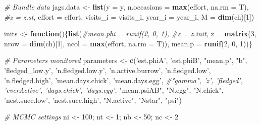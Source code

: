 \documentclass[]{article}
\newenvironment{Shaded}{\begin{snugshade}}{\end{snugshade}}
\newcommand{\KeywordTok}[1]{\textcolor[rgb]{0.13,0.29,0.53}{\textbf{#1}}}
\newcommand{\DataTypeTok}[1]{\textcolor[rgb]{0.13,0.29,0.53}{#1}}
\newcommand{\DecValTok}[1]{\textcolor[rgb]{0.00,0.00,0.81}{#1}}
\newcommand{\StringTok}[1]{\textcolor[rgb]{0.31,0.60,0.02}{#1}}
\newcommand{\CommentTok}[1]{\textcolor[rgb]{0.56,0.35,0.01}{\textit{#1}}}
\newcommand{\ControlFlowTok}[1]{\textcolor[rgb]{0.13,0.29,0.53}{\textbf{#1}}}
\newcommand{\NormalTok}[1]{#1}
\begin{document}
\begin{Shaded}
\begin{Highlighting}[]
\CommentTok{# Bundle data}
\NormalTok{jags.data <-}\StringTok{ }\KeywordTok{list}\NormalTok{(}\DataTypeTok{y =}\NormalTok{ y, }\DataTypeTok{n.occasions =} \KeywordTok{max}\NormalTok{(effort, }\DataTypeTok{na.rm =}\NormalTok{ T), }
                  \CommentTok{#z = z.st, }
                  \DataTypeTok{effort =}\NormalTok{ effort, }
                  \DataTypeTok{visits_i =}\NormalTok{ visits_i, }\DataTypeTok{year_i =}\NormalTok{ year_i,}
                  \DataTypeTok{M =} \KeywordTok{dim}\NormalTok{(ch)[}\DecValTok{1}\NormalTok{])}

\NormalTok{inits <-}\StringTok{ }\ControlFlowTok{function}\NormalTok{()\{}\KeywordTok{list}\NormalTok{(}\CommentTok{#mean.phi = runif(2, 0, 1), }
                         \CommentTok{#z = z.init,}
                         \DataTypeTok{z =} \KeywordTok{matrix}\NormalTok{(}\DecValTok{3}\NormalTok{, }\DataTypeTok{nrow =} \KeywordTok{dim}\NormalTok{(ch)[}\DecValTok{1}\NormalTok{], }\DataTypeTok{ncol =} \KeywordTok{max}\NormalTok{(effort, }\DataTypeTok{na.rm =}\NormalTok{ T)),}
                         \DataTypeTok{mean.p =} \KeywordTok{runif}\NormalTok{(}\DecValTok{2}\NormalTok{, }\DecValTok{0}\NormalTok{, }\DecValTok{1}\NormalTok{))\}  }

\CommentTok{# Parameters monitored}
\NormalTok{parameters <-}\StringTok{ }\KeywordTok{c}\NormalTok{(}\StringTok{'est.phiA'}\NormalTok{, }\StringTok{'est.phiB'}\NormalTok{, }\StringTok{"mean.p"}\NormalTok{, }\StringTok{"b"}\NormalTok{, }\StringTok{'fledged_low.y'}\NormalTok{, }\StringTok{'n.fledged.low.y'}\NormalTok{,}
                \StringTok{'n.active.burrow'}\NormalTok{, }\StringTok{'n.fledged.low'}\NormalTok{, }\StringTok{'n.fledged.high'}\NormalTok{, }\StringTok{'mean.days.chick'}\NormalTok{, }\StringTok{'mean.days.egg'}\NormalTok{,}
                \CommentTok{#"gamma", 'z', 'fledged', 'everActive', 'days.chick', 'days.egg',}
                \StringTok{"mean.psiAB"}\NormalTok{, }\StringTok{"N.egg"}\NormalTok{, }\StringTok{"N.chick"}\NormalTok{, }\StringTok{'nest.succ.low'}\NormalTok{, }\StringTok{'nest.succ.high'}\NormalTok{, }
                \StringTok{"N.active"}\NormalTok{, }\StringTok{"Nstar"}\NormalTok{, }\StringTok{"psi"}\NormalTok{)}
     
\CommentTok{# MCMC settings}
\NormalTok{ni <-}\StringTok{ }\DecValTok{100}\NormalTok{; nt <-}\StringTok{ }\DecValTok{1}\NormalTok{; nb <-}\StringTok{ }\DecValTok{50}\NormalTok{; nc <-}\StringTok{ }\DecValTok{2}
     

\end{Highlighting}
\end{Shaded}
\end{document}
